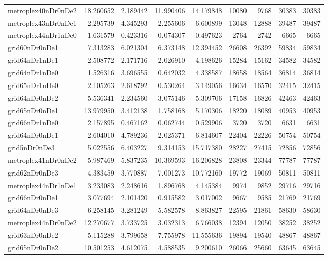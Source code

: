 \begin{longtable}{|l|r|r|r|r|r|r|r|r|}
metroplex40nDr0nDe2 & 18.260652 & 2.189442 & 11.990406 & 14.179848 & 10080 & 9768 & 30383 & 30383 \\
metroplex43nDr0nDe1 & 2.295739 & 4.345293 & 2.255606 & 6.600899 & 13048 & 12888 & 39487 & 39487 \\
metroplex44nDr1nDe0 & 1.631579 & 0.423316 & 0.074307 & 0.497623 & 2764 & 2742 & 6665 & 6665 \\
grid60nDr0nDe1 & 7.313283 & 6.021304 & 6.373148 & 12.394452 & 26608 & 26392 & 59834 & 59834 \\
grid64nDr1nDe1 & 2.508772 & 2.171716 & 2.026910 & 4.198626 & 15284 & 15162 & 34582 & 34582 \\
grid64nDr1nDe0 & 1.526316 & 3.696555 & 0.642032 & 4.338587 & 18658 & 18564 & 36814 & 36814 \\
grid65nDr1nDe0 & 2.105263 & 2.618792 & 0.530264 & 3.149056 & 16634 & 16570 & 32415 & 32415 \\
grid64nDr0nDe2 & 5.536341 & 2.234560 & 3.075146 & 5.309706 & 17158 & 16826 & 42463 & 42463 \\
grid65nDr0nDe1 & 13.979950 & 3.412138 & 1.758168 & 5.170306 & 18220 & 18089 & 40953 & 40953 \\
grid66nDr1nDe0 & 2.157895 & 0.467162 & 0.062744 & 0.529906 & 3720 & 3720 & 6631 & 6631 \\
grid64nDr0nDe1 & 2.604010 & 4.789236 & 2.025371 & 6.814607 & 22404 & 22226 & 50754 & 50754 \\
grid5nDr0nDe3 & 5.022556 & 6.403227 & 9.314153 & 15.717380 & 28227 & 27415 & 72856 & 72856 \\
metroplex41nDr0nDe2 & 5.987469 & 5.837235 & 10.369593 & 16.206828 & 23808 & 23344 & 77787 & 77787 \\
grid62nDr0nDe3 & 4.383459 & 3.770887 & 7.001273 & 10.772160 & 19772 & 19069 & 50811 & 50811 \\
metroplex44nDr1nDe1 & 3.233083 & 2.248616 & 1.896768 & 4.145384 & 9974 & 9852 & 29716 & 29716 \\
grid66nDr0nDe1 & 3.077694 & 2.101420 & 0.915582 & 3.017002 & 9667 & 9585 & 21769 & 21769 \\
grid64nDr0nDe3 & 6.258145 & 3.281249 & 5.582578 & 8.863827 & 22595 & 21861 & 58630 & 58630 \\
metroplex44nDr0nDe2 & 12.270677 & 3.733725 & 3.032313 & 6.766038 & 12394 & 12050 & 38252 & 38252 \\
grid63nDr0nDe2 & 5.115288 & 3.799658 & 7.755978 & 11.555636 & 19894 & 19540 & 48867 & 48867 \\
grid65nDr0nDe2 & 10.501253 & 4.612075 & 4.588535 & 9.200610 & 26066 & 25660 & 63645 & 63645 \\

\end{longtable}
